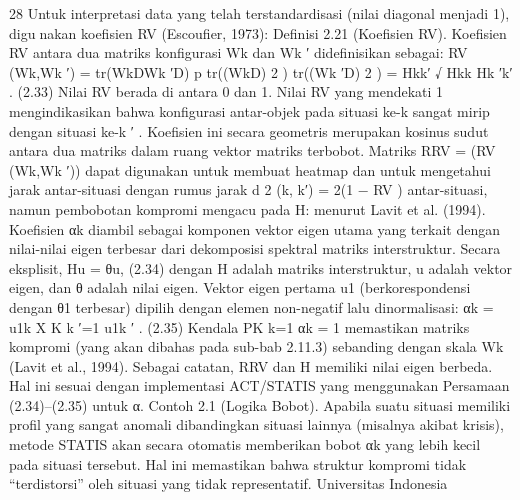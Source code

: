 28
Untuk interpretasi data yang telah terstandardisasi (nilai diagonal menjadi 1), digunakan koefisien RV (Escoufier, 1973):
Definisi 2.21 (Koefisien RV). Koefisien RV antara dua matriks konfigurasi Wk dan Wk
′
didefinisikan sebagai:
RV (Wk,Wk
′) = tr(WkDWk
′D)
p
tr((WkD)
2
) tr((Wk
′D)
2
)
=
Hkk′
√
Hkk Hk
′k′
. (2.33)
Nilai RV berada di antara 0 dan 1. Nilai RV yang mendekati 1 mengindikasikan bahwa
konfigurasi antar-objek pada situasi ke-k sangat mirip dengan situasi ke-k
′
. Koefisien ini
secara geometris merupakan kosinus sudut antara dua matriks dalam ruang vektor matriks
terbobot.
Matriks RRV = (RV (Wk,Wk
′)) dapat digunakan untuk membuat heatmap dan untuk
mengetahui jarak antar-situasi dengan rumus jarak d
2
(k, k′) = 2(1 − RV ) antar-situasi,
namun pembobotan kompromi mengacu pada H: menurut Lavit et al. (1994). Koefisien
αk diambil sebagai komponen vektor eigen utama yang terkait dengan nilai-nilai eigen
terbesar dari dekomposisi spektral matriks interstruktur. Secara eksplisit,
Hu = θu, (2.34)
dengan H adalah matriks interstruktur, u adalah vektor eigen, dan θ adalah nilai eigen.
Vektor eigen pertama u1 (berkorespondensi dengan θ1 terbesar) dipilih dengan elemen
non-negatif lalu dinormalisasi:
αk =
u1k
X
K
k
′=1
u1k
′
. (2.35)
Kendala PK
k=1 αk = 1 memastikan matriks kompromi (yang akan dibahas pada sub-bab
2.11.3) sebanding dengan skala Wk (Lavit et al., 1994). Sebagai catatan, RRV dan H
memiliki nilai eigen berbeda. Hal ini sesuai dengan implementasi ACT/STATIS yang
menggunakan Persamaan (2.34)–(2.35) untuk α.
Contoh 2.1 (Logika Bobot). Apabila suatu situasi memiliki profil yang sangat anomali
dibandingkan situasi lainnya (misalnya akibat krisis), metode STATIS akan secara otomatis
memberikan bobot αk yang lebih kecil pada situasi tersebut. Hal ini memastikan bahwa
struktur kompromi tidak “terdistorsi” oleh situasi yang tidak representatif.
Universitas Indonesia


